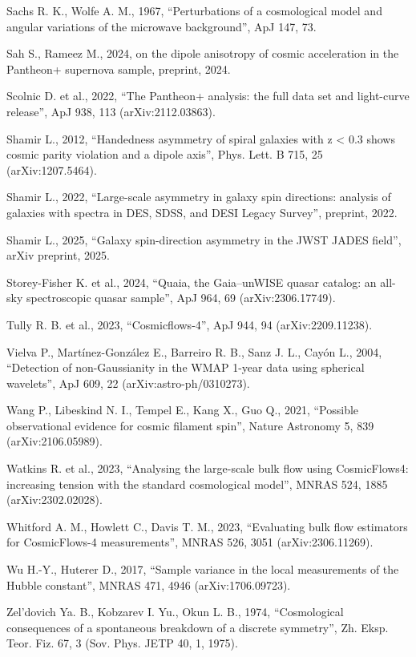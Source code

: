 \documentclass[
]{article}
\begin{document}
Sachs R. K., Wolfe A. M., 1967, ``Perturbations of a cosmological model
and angular variations of the microwave background'', ApJ 147, 73.

Sah S., Rameez M., 2024, on the dipole anisotropy of cosmic acceleration
in the Pantheon+ supernova sample, preprint, 2024.

Scolnic D. et al., 2022, ``The Pantheon+ analysis: the full data set and
light-curve release'', ApJ 938, 113 (arXiv:2112.03863).

Shamir L., 2012, ``Handedness asymmetry of spiral galaxies with z
\textless{} 0.3 shows cosmic parity violation and a dipole axis'', Phys.
Lett. B 715, 25 (arXiv:1207.5464).

Shamir L., 2022, ``Large-scale asymmetry in galaxy spin directions:
analysis of galaxies with spectra in DES, SDSS, and DESI Legacy
Survey'', preprint, 2022.

Shamir L., 2025, ``Galaxy spin-direction asymmetry in the JWST JADES
field'', arXiv preprint, 2025.

Storey-Fisher K. et al., 2024, ``Quaia, the Gaia--unWISE quasar catalog:
an all-sky spectroscopic quasar sample'', ApJ 964, 69
(arXiv:2306.17749).

Tully R. B. et al., 2023, ``Cosmicflows-4'', ApJ 944, 94
(arXiv:2209.11238).

Vielva P., Martínez-González E., Barreiro R. B., Sanz J. L., Cayón L.,
2004, ``Detection of non-Gaussianity in the WMAP 1-year data using
spherical wavelets'', ApJ 609, 22 (arXiv:astro-ph/0310273).

Wang P., Libeskind N. I., Tempel E., Kang X., Guo Q., 2021, ``Possible
observational evidence for cosmic filament spin'', Nature Astronomy 5,
839 (arXiv:2106.05989).

Watkins R. et al., 2023, ``Analysing the large-scale bulk flow using
CosmicFlows4: increasing tension with the standard cosmological model'',
MNRAS 524, 1885 (arXiv:2302.02028).

Whitford A. M., Howlett C., Davis T. M., 2023, ``Evaluating bulk flow
estimators for CosmicFlows-4 measurements'', MNRAS 526, 3051
(arXiv:2306.11269).

Wu H.-Y., Huterer D., 2017, ``Sample variance in the local measurements
of the Hubble constant'', MNRAS 471, 4946 (arXiv:1706.09723).

Zel'dovich Ya. B., Kobzarev I. Yu., Okun L. B., 1974, ``Cosmological
consequences of a spontaneous breakdown of a discrete symmetry'', Zh.
Eksp. Teor. Fiz. 67, 3 (Sov. Phys. JETP 40, 1, 1975).
\end{document}
